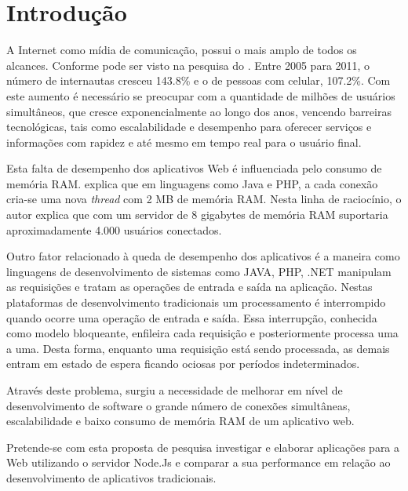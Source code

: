 \chapter{Introdução}
\label{introducao}

\vspace{-1.9cm}

  
  A Internet como mídia de comunicação, possui o mais amplo de todos os alcances. 
  Conforme pode ser visto na pesquisa do . Entre 2005 para 2011, 
  o número de internautas cresceu 143.8\%  e o de pessoas com celular, 107.2\%.
  Com este aumento é necessário se preocupar com a quantidade de milhões de usuários simultâneos,
  que cresce exponencialmente ao longo dos anos, vencendo barreiras tecnológicas, tais como 
  escalabilidade e desempenho para oferecer serviços e informações com rapidez e até mesmo em tempo
  real para o usuário final.
  
  Esta falta de desempenho dos aplicativos Web é influenciada pelo consumo de memória RAM.  
  explica que em linguagens como Java e PHP, a cada conexão cria-se uma nova \textit{thread} com 2 MB de memória RAM. 
  Nesta linha de raciocínio, o autor explica que com um servidor de 8 gigabytes de memória RAM suportaria
  aproximadamente 4.000 usuários conectados.
  
  Outro fator relacionado à queda de desempenho dos aplicativos é a maneira como linguagens de desenvolvimento de sistemas como JAVA, PHP,
  .NET manipulam as requisições e tratam as operações de entrada e saída na aplicação.   
  Nestas plataformas de desenvolvimento tradicionais um processamento é interrompido quando ocorre uma operação de entrada e saída.
  Essa interrupção, conhecida como modelo bloqueante, enfileira cada requisição e posteriormente processa uma a uma. Desta forma, 
  enquanto uma requisição está sendo processada, as demais entram em estado de espera ficando ociosas
  por períodos indeterminados\cite{Pereira:2013}.
  
  Através deste problema, surgiu a necessidade de melhorar em nível de desenvolvimento de software o grande número de conexões 
  simultâneas, escalabilidade e baixo consumo de memória RAM de um aplicativo web\cite{Oliveira:2012}.
  
  Pretende-se com esta proposta de pesquisa investigar e elaborar aplicações para a Web 
  utilizando o servidor Node.Js e comparar a sua performance em relação ao desenvolvimento
  de aplicativos tradicionais.
  
